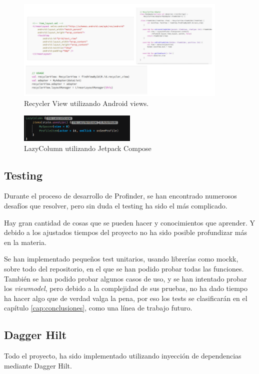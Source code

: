 \begin{figure}[h]
	\centering
	\includegraphics[width = 0.9\textwidth]{Imagenes/Fuentes/views_demo.png}
	\caption{Recycler View utilizando Android views.}
	\label{fig:views_demo}
\end{figure}
\begin{figure}[h]
	\centering
	\includegraphics[width = 0.5\textwidth]{Imagenes/Fuentes/compose_demo.png}
	\caption{LazyColumn utilizando Jetpack Compose}
	\label{fig:compose_demo}
\end{figure}

\subsection{Testing}
\label{subsec:testing}
Durante el proceso de desarrollo de Profinder, se han encontrado numerosos desafíos que resolver, pero sin duda el testing ha sido el más complicado. 

Hay gran cantidad de cosas que se pueden hacer y conocimientos que aprender. Y debido a los ajustados tiempos del proyecto no ha sido posible profundizar más en la materia.

Se han implementado pequeños test unitarios, usando librerías como mockk\hyperlink{cap:biblio}{}, sobre todo del repositorio, en el que se han podido probar todas las funciones. También se han podido probar algunos casos de uso, y se han intentado probar los \textit{viewmodel}, pero debido a la complejidad de sus pruebas, no ha dado tiempo ha hacer algo que de verdad valga la pena, por eso los tests se clasificarán en el capítulo \ref{cap:conclusiones}, como una línea de trabajo futuro.

\subsection{Dagger Hilt}
Todo el proyecto, ha sido implementado utilizando inyección de dependencias mediante Dagger Hilt\hyperlink{cap:biblio}{}. 

